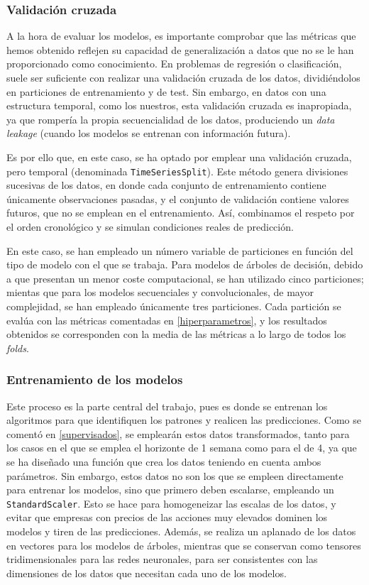\documentclass[a4paper,onecolumn]{extarticle}
\begin{document}
\begin{sloppypar}
\subsubsection{Validación cruzada} \label{crossval}
A la hora de evaluar los modelos, es importante comprobar que las métricas que hemos obtenido reflejen su capacidad de generalización a datos que no se le han proporcionado como 
conocimiento. En problemas de regresión o clasificación, suele ser suficiente con realizar una validación cruzada de los datos, dividiéndolos en particiones de entrenamiento y de test.
Sin embargo, en datos con una estructura temporal, como los nuestros, esta validación cruzada es inapropiada, ya que rompería la propia secuencialidad de los datos, produciendo un 
\textit{data leakage} (cuando los modelos se entrenan con información futura). 

Es por ello que, en este caso, se ha optado por emplear una validación cruzada, pero temporal (denominada \texttt{TimeSeriesSplit}). Este método genera divisiones sucesivas de los 
datos, en donde cada conjunto de entrenamiento contiene únicamente observaciones pasadas, y el conjunto de validación contiene valores futuros, que no se emplean en el entrenamiento. 
Así, combinamos el respeto por el orden cronológico y se simulan condiciones reales de predicción.

En este caso, se han empleado un número variable de particiones en función del tipo de modelo con el que se trabaja. Para modelos de árboles de decisión, debido a que presentan un 
menor coste computacional, se han utilizado cinco particiones; mientas que para los modelos secuenciales y convolucionales, de mayor complejidad, se han empleado únicamente tres 
particiones. Cada partición se evalúa con las métricas comentadas en \ref{hiperparametros}, y los resultados obtenidos se corresponden con la media de las métricas a lo largo de 
todos los \textit{folds}.

\subsubsection{Entrenamiento de los modelos} \label{training}
Este proceso es la parte central del trabajo, pues es donde se entrenan los algoritmos para que identifiquen los patrones y realicen las predicciones. Como se comentó en 
\ref{supervisados}, se emplearán estos datos transformados, tanto para los casos en el que se emplea el horizonte de 1 semana como para el de 4, ya que se ha diseñado una 
función que crea los datos teniendo en cuenta ambos parámetros. Sin embargo, estos datos no son los que se empleen directamente para entrenar los modelos, sino que primero 
deben escalarse, empleando un \texttt{StandardScaler}. Esto se hace para homogeneizar las escalas de los datos, y evitar que empresas con precios de las acciones muy elevados 
dominen los modelos y tiren de las predicciones. Además, se realiza un aplanado de los datos en vectores para los modelos de árboles, mientras que se conservan como tensores 
tridimensionales para las redes neuronales, para ser consistentes con las dimensiones de los datos que necesitan cada uno de los modelos.


\end{sloppypar}
\end{document}
